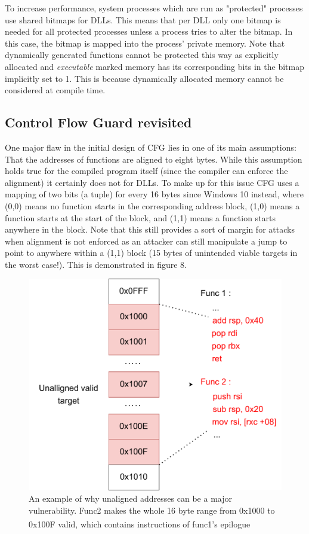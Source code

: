 \documentclass[10pt,twocolumn,a4paper]{article}
\begin{document}
To increase performance, system processes which are run as "protected" processes use shared bitmaps for DLLs.
This means that per DLL only one bitmap is needed for all protected processes unless a process tries to alter the bitmap. In this case, the bitmap is mapped into the process' private memory.
Note that dynamically generated functions cannot be protected this way as explicitly allocated and \emph{executable} marked memory has its corresponding bits in the bitmap implicitly set to 1.
This is because dynamically allocated memory cannot be considered at compile time.
\subsection{Control Flow Guard revisited}
One major flaw in the initial design of CFG lies in one of its main assumptions: That the addresses of functions are aligned to eight bytes.
While this assumption holds true for the compiled program itself (since the compiler can enforce the alignment) it certainly does not for DLLs.
To make up for this issue CFG uses a mapping of two bits (a tuple) for every 16 bytes since Windows 10 instead, where (0,0) means no function starts in the corresponding address block, (1,0) means a function starts at the start of the block, and (1,1) means a function starts anywhere in the block\cite{tuple}.
Note that this still provides a sort of margin for attacks when alignment is not enforced as an attacker can still manipulate a jump to point to anywhere within a (1,1) block (15 bytes of unintended viable targets in the worst case!).
This is demonstrated in figure 8.
\begin{figure}[h]
	\includegraphics[keepaspectratio,width=\linewidth]{fig/unallignedcode}
	\caption{An example of why unaligned addresses can be a major vulnerability. Func2 makes the whole 16 byte range from 0x1000 to 0x100F valid, which contains instructions of func1's epilogue\textsuperscript{\cite{cfgexplore}}}
\end{figure}\newline
\end{document}
